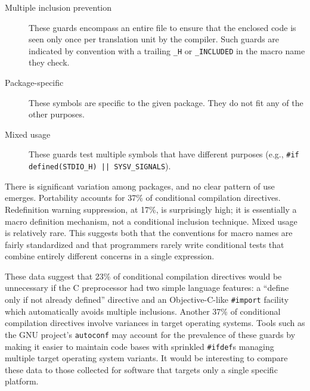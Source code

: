 \documentclass[10pt]{article}
\newcommand{\ppd}[1]{\texttt{\##1}}
\begin{document}
\begin{description}
\item[Multiple inclusion prevention]
  These guards encompass an entire file to ensure that the enclosed code is
  seen only once per translation unit by the compiler.  Such guards are
  indicated by convention with a trailing \verb|_H| or \verb|_INCLUDED| in the macro name
  they check.

\item[Package-specific] 
  These symbols are specific to the given package.  They do not fit any of
  the other purposes.

\item[Mixed usage] These guards test multiple symbols
  that have different purposes (e.g., {\tt \#if defined(\verb|STDIO_H|) ||
  \verb|SYSV_SIGNALS|}).

\end{description}



There is significant variation among packages, and no clear pattern of use
emerges.  Portability accounts for 37\% of conditional compilation
directives.  Redefinition warning suppression, at 17\%, is surprisingly
high; it is essentially a macro definition mechanism, not a conditional
inclusion technique.  Mixed usage is relatively rare.  This suggests both
that the conventions for macro names are fairly standardized and that
programmers rarely write conditional tests that combine entirely different
concerns in a single expression.


These data suggest that 23\% of conditional compilation directives
would be unnecessary if the C preprocessor had two simple language
features: a ``define only if not already defined'' directive and 
an Objective-C-like \ppd{import} facility which automatically avoids
multiple inclusions.  Another 37\% of conditional compilation directives
involve variances in target operating
systems.  Tools such as the GNU project's \texttt{autoconf} may account
for the prevalence of these guards by making it easier to maintain code
bases with sprinkled \ppd{ifdef}s managing multiple target operating
system variants.  It would be interesting to compare these data to those
collected for software that targets only a single specific platform.
\end{document}
